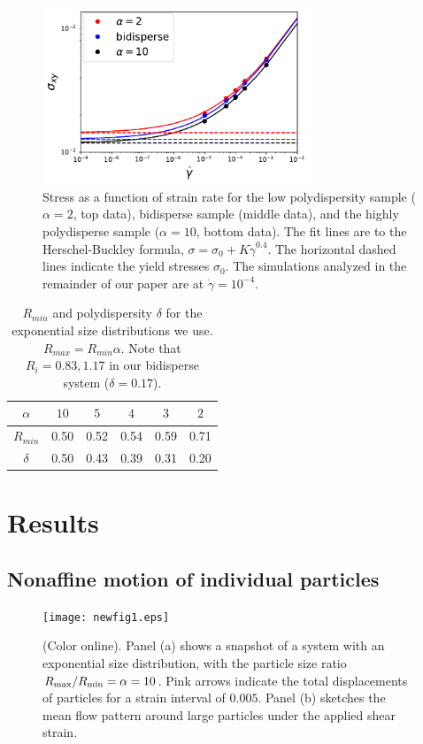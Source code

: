 \documentclass[%
 reprint,
 amsmath,amssymb,
 aps,
]{revtex4-2}
\begin{document}
\begin{figure}[ht]
    \centering
    \includegraphics[width=8cm]{hb_exp10_bi_stressxy123022.pdf}
    \caption{Stress as a function of strain rate for the low polydispersity sample ($\alpha=2$, top data), bidisperse sample (middle data), and the highly polydisperse sample ($\alpha=10$, bottom data).  The fit lines are to the Herschel-Buckley formula, $\sigma = \sigma_0 + K \dot{\gamma}^{0.4}$.  The horizontal dashed lines indicate the yield stresses $\sigma_0$.  The simulations analyzed in the remainder of our paper are at $\dot{\gamma}=10^{-4}$.}  
    \label{fig:hb}
    \vspace*{-12pt}
\end{figure}

\begin{table}
    \centering
    \begin{tabular}{c|c|c|c|c|c}
    $\alpha$ & $10$ & $5$ & $4$ & $3$ & $2$ \\
    \hline
    $R_{min}$ & 0.50 & 0.52 & 0.54 & 0.59 & 0.71 \\
    $\delta$ & 0.50 & 0.43 & 0.39 & 0.31 & 0.20
    \end{tabular}
    \caption{$R_{min}$ and polydispersity $\delta$ for the exponential size distributions we use. $R_{max}=R_{min} \alpha$. Note that $R_i=0.83,1.17$ in our bidisperse system ($\delta=0.17$).}
    \label{tab:size}
\end{table}


\section{Results}

\subsection{Nonaffine motion of individual particles}

\begin{figure}[ht]
    \centering
    \texttt{[image: newfig1.eps]}
    \caption{(Color online). Panel (a) shows a snapshot of a system with an exponential size distribution, with the particle size ratio $R_{\max}/R_{\rm min}= \alpha = 10$. Pink arrows indicate the total displacements of particles for a strain interval of $0.005$.  Panel (b) sketches the mean flow pattern around large particles under the applied shear strain.  
    }
    \label{fig:sample_example}
    \vspace*{-12pt}
\end{figure}
\end{document}
